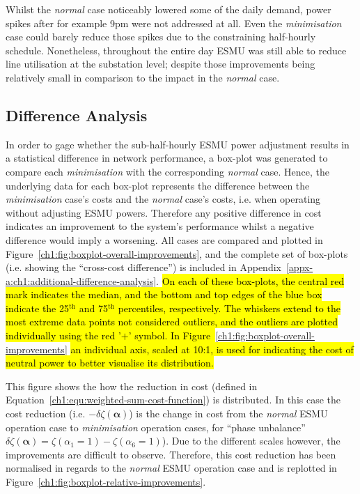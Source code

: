 

Whilst the \textit{normal} case noticeably lowered some of the daily demand, power spikes after for example 9pm were not addressed at all.
Even the \textit{minimisation} case could barely reduce those spikes due to the constraining half-hourly schedule.
Nonetheless, throughout the entire day ESMU was still able to reduce line utilisation at the substation level; despite those improvements being relatively small in comparison to the impact in the \textit{normal} case.

\subsection{Difference Analysis}
\label{ch1:subsec:difference-analysis}

In order to gage whether the sub-half-hourly ESMU power adjustment results in a statistical difference in network performance, a box-plot was generated to compare each \textit{minimisation} with the corresponding \textit{normal} case.
Hence, the underlying data for each box-plot represents the difference between the \textit{minimisation} case's costs and the \textit{normal} case's costs, i.e. when operating without adjusting ESMU powers.
Therefore any positive difference in cost indicates an improvement to the system's performance whilst a negative difference would imply a worsening.
All cases are compared and plotted in Figure~\ref{ch1:fig:boxplot-overall-improvements}, and the complete set of box-plots (i.e. showing the ``cross-cost difference'') is included in Appendix~\ref{appx-a:ch1:additional-difference-analysis}.
\hl{On each of these box-plots, the central red mark indicates the median, and the bottom and top edges of the blue box indicate the 25$^\text{th}$ and 75$^\text{th}$ percentiles, respectively.
The whiskers extend to the most extreme data points not considered outliers, and the outliers are plotted individually using the red '$+$' symbol.
In Figure~}\ref{ch1:fig:boxplot-overall-improvements}\hl{ an individual axis, scaled at 10:1, is used for indicating the cost of neutral power to better visualise its distribution.}



This figure shows the how the reduction in cost (defined in Equation~\ref{ch1:equ:weighted-sum-cost-function}) is distributed.
In this case the cost reduction (i.e. $-\delta\zeta(\boldsymbol{\alpha})$) is the change in cost from the \textit{normal} ESMU operation case to \textit{minimisation} operation cases, for ``phase unbalance'' $\delta\zeta(\boldsymbol{\alpha}) = \zeta(\alpha_1 = 1) - \zeta(\alpha_6 = 1)$).
Due to the different scales however, the improvements are difficult to observe.
Therefore, this cost reduction has been normalised in regards to the \textit{normal} ESMU operation case and is replotted in Figure~\ref{ch1:fig:boxplot-relative-improvements}.

